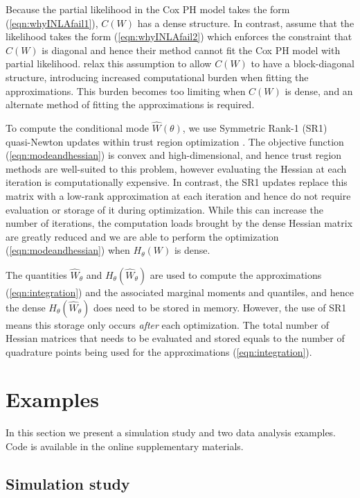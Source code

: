 \documentclass[ba]{imsart}
\begin{document}
Because the partial likelihood in the Cox PH model takes the form (\ref{eqn:whyINLAfail1}), $C(W)$ has a dense structure. In contrast, \cite{inla} assume that the likelihood takes the form (\ref{eqn:whyINLAfail2}) which enforces the constraint that $C(W)$ is diagonal and hence their method cannot fit the Cox PH model with partial likelihood. \cite{casecross} relax this assumption to allow $C(W)$ to have a block-diagonal structure, introducing increased computational burden when fitting the approximations. This burden becomes too limiting when $C(W)$ is dense, and an alternate method of fitting the approximations is required. 

To compute the conditional mode $\hat{W}(\theta)$, we use Symmetric Rank-1 (SR1) quasi-Newton updates within trust region optimization \citep{trustoptim}. The objective function (\ref{eqn:modeandhessian}) is convex and high-dimensional, and hence trust region methods are well-suited to this problem, however evaluating the Hessian at each iteration is computationally expensive. In contrast, the SR1 updates replace this matrix with a low-rank approximation at each iteration and hence do not require evaluation or storage of it during optimization. While this can increase the number of iterations, the computation loads brought by the dense Hessian matrix are greatly reduced and we are able to perform the optimization (\ref{eqn:modeandhessian}) when $H_{\theta}(W)$ is dense. 

The quantities $\widehat{W}_{\theta}$ and $H_{\theta}(\widehat{W}_{\theta})$ are used to compute the approximations (\ref{eqn:integration}) and the associated marginal moments and quantiles, and hence the dense $H_{\theta}(\widehat{W}_{\theta})$ does need to be stored in memory. However, the use of SR1 means this storage only occurs \emph{after} each optimization. The total number of Hessian matrices that needs to be evaluated and stored equals to the number of quadrature points being used for the approximations (\ref{eqn:integration}).


\section{Examples}\label{sec:example}

In this section we present a simulation study and two data analysis examples. Code is available in the online supplementary materials.

\subsection{Simulation study}\label{subsec:sim}
\end{document}

